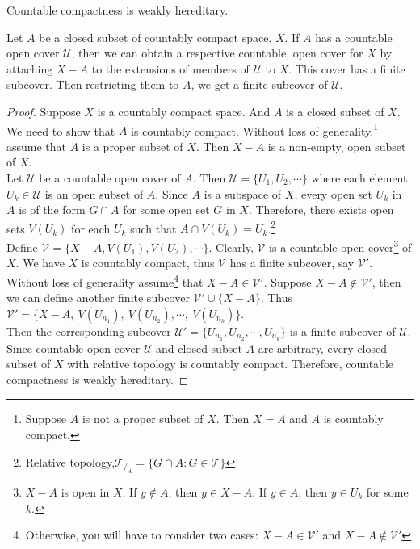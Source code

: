 \begin{theorem}
	Countable compactness is weakly hereditary.\cite[11.1.3]{joshi}
\end{theorem}
\begin{synopsis}
	Let $A$ be a closed subset of countably compact space, $X$. If $A$ has a countable open cover $\mathcal{U}$, then we can obtain a respective countable, open cover for $X$ by attaching $X-A$ to the extensions of members of $\mathcal{U}$ to $X$. This cover has a finite subcover. Then restricting them to $A$, we get a finite subcover of $\mathcal{U}$.
\end{synopsis}
\begin{proof}
	Suppose $X$ is a countably compact space. And $A$ is a closed subset of $X$. We need to show that $A$ is countably compact. Without loss of generality,\footnote{Suppose $A$ is not a proper subset of $X$. Then $X = A$ and $A$ is countably compact.} assume that $A$ is a proper subset of $X$. Then $X-A$ is a non-empty, open subset of $X$.\\ 

	Let $\mathcal{U}$ be a countable open cover of $A$. Then $\mathcal{U} = \{ U_1, U_2, \cdots \}$ where each element $U_k \in \mathcal{U}$ is an open subset of $A$. Since $A$ is a subspace of $X$, every open set $U_k$ in $A$ is of the form $G \cap A$ for some open set $G$ in $X$. Therefore, there exists open sets $V(U_k)$ for each $U_k$ such that $A \cap V(U_k) = U_k$.\footnote{Relative topology,$\mathcal{T}_{/_A} = \{ G \cap A : G \in \mathcal{T} \}$}\\

	Define $\mathcal{V} = \{ X-A, V(U_1), V(U_2), \cdots \}$. Clearly, $\mathcal{V}$ is a countable open cover\footnote{$X-A$ is open in $X$. If $y \not\in A$, then $y \in X-A$. If $y \in A$, then $y \in U_k$ for some $k$.} of $X$. We have $X$ is countably compact, thus $\mathcal{V}$ has a finite subcover, say $\mathcal{V}'$. Without loss of generality assume\footnote{Otherwise, you will have to consider two cases: $X-A \in \mathcal{V}'$ and $X-A \not\in \mathcal{V}'$} that $X-A \in \mathcal{V}'$. Suppose $X-A \not\in \mathcal{V}'$, then we can define another finite subcover $\mathcal{V}' \cup \{X-A\}$. Thus $\mathcal{V}' = \{ X-A,\ V(U_{n_1}),\ V(U_{n_2}),\cdots,\ V(U_{n_k})\}$.\\

	Then the corresponding subcover $\mathcal{U}'=\{U_{n_1},U_{n_2},\cdots,U_{n_k}\}$ is a finite subcover of $\mathcal{U}$. Since countable open cover $\mathcal{U}$ and closed subset $A$ are arbitrary, every closed subset of $X$ with relative topology is countably compact. Therefore, countable compactness is weakly hereditary.
\end{proof}

